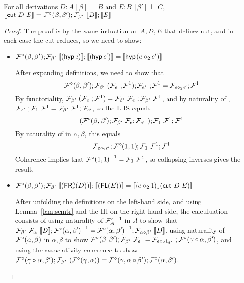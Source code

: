 \documentclass{drl-common/llncs}
\renewcommand{\sem}[1]{\ensuremath{ \llbracket #1 \rrbracket}}
\newcommand{\inv}[1]{\ensuremath{{#1}^{-1}}}
\newcommand\compo[2]{\ensuremath{#1 \circ #2}}
\newcommand\comph[2]{\ensuremath{#1 \mathbin{\circ_2} #2}}
\newcommand\seq[3]{\ensuremath{#1 \, [ #2 ] \, \vdash \, #3}}
\newcommand\tr[2]{\ensuremath{{{#1}_{*}(#2)}}}
\newcommand\cutsym{\ensuremath{\dsd{cut}}}
\newcommand\cut[2]{\ensuremath{{\cutsym \,\, #1 \,\, #2}}}
\newcommand\hyp[1]{\ensuremath{\dsd{hyp} \, {#1}}}
\newcommand\FR[3]{\ensuremath{\dsd{FR}^{#1}_{#2}(#3)}}
\newcommand\FL[1]{\ensuremath{\dsd{FL}(#1)}}
\begin{document}
\begin{lemma}\label{lem:semcut}
For all derivations $D : \seq{A}{\beta}{B}$ and $E : \seq{B}{\beta'}{C}$, $\sem{\cut D E} = {\semFcomp(\beta,\beta')};{\semF{\beta'}{\sem{D}}};{\sem{E}}$
\end{lemma}

\newcommand{\semofcut}[2]{{\semFcomp(\beta,\beta')};{\semF{\beta'}{\sem{#1}}};{\sem{#2}}}

\begin{proof}

The proof is by the same induction on $A,D,E$ that defines cut, and in
each case the cut reduces, so we need to show:

\begin{itemize}
\item $\semofcut {(\hyp e)} {(\hyp {e'})} = \sem{\hyp {(\comph{e}{e'})}}$

After expanding definitions, we need to show that
\[
\semFcomp(\beta,\beta');\semF{\beta'}{(\semF{e};\semFone)};\semF{e'};\semFone = \semFo{\comph{e}{e'}};\semFone
\]
By functoriality, $\mathcal{F}_{\beta'} \,\, (\mathcal{F}_{e} \,\, ;{\mathcal{F}^1}) =
\mathcal{F}_{\beta'} \,\, \mathcal{F}_{e} \,\, ;\mathcal{F}_{\beta'} \,\, {\mathcal{F}^1}$, and by naturality of
, $\mathcal{F}_{e'} \,\, ;{\mathcal{F}_{1} \,\, {\mathcal{F}^1}} =
\mathcal{F}_{\beta'} \,\, {\mathcal{F}^1};{\mathcal{F}_{e'}}$,
so the LHS equals
\[
(\mathcal{F}^\circ(\beta,\beta');\mathcal{F}_{\beta'} \,\, {\mathcal{F}_{e}};\mathcal{F}_{e'} \,\, );{\mathcal{F}_{1} \,\, {\mathcal{F}^1}};{\mathcal{F}^1}
\]
By naturality of \semFcomp in $\alpha,\beta$, this equals
\[
\semFo{\comph{e}{e'}};\semFcomp(1,1);{\semF{1}{\semFone}};\semFone
\]
Coherence implies that $\inv{\semFcomp(1,1)} = \semF{1}{\semFone}$, so
collapsing inverses gives the result.  

\item $\semofcut {(\FR \gamma e D)} {(\FL E)} = \sem{ \tr {(\comph{e}{1})} {\cut D E} }$

After unfolding the definitions on the left-hand side, and using
Lemma~\ref{lem:semtr} and the IH on the right-hand side, 
the calculuation consists of using naturality of $\inv{\semFcomp_A}$ in $A$ to
show that $\semF{\beta'}{\semF{\alpha}{\sem
    D}};\inv{\semFcomp(\alpha,\beta')} =
\inv{\semFcomp(\alpha,\beta')};\semF{\compo \alpha \beta'}{\sem{D}}$,
using naturality of $\mathcal{F}^\circ(\alpha,\beta)$ in $\alpha,\beta$ to
show 
$\semFcomp(\beta,\beta');\semF{\beta'}{\semF{e}} =
\semF{\comph{e}{1_{\beta'}}};\semFcomp(\compo{\gamma}{\alpha},\beta')$, 
and using the associativity coherence to show
$\semFcomp(\compo{\gamma}{\alpha},\beta');\semF{\beta'}{(\semFcomp(\gamma,\alpha))}
= \semFcomp(\gamma,\compo{\alpha}{\beta'});\semFcomp(\alpha,\beta')$.


\end{itemize}
\end{proof}
\end{document}
